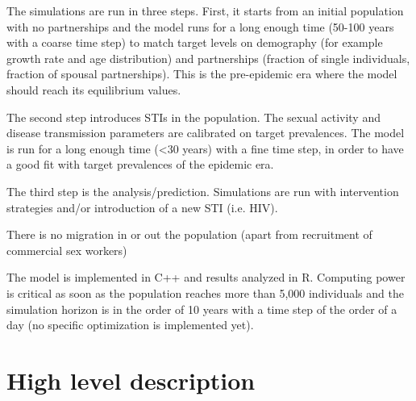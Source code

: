 \documentclass[11pt, onecolumn]{article}
\begin{document}
The simulations are run in three steps. First, it starts from an initial population with no partnerships and the model runs for a long enough time (50-100 years with a coarse time step) to match target levels on demography (for example growth rate and age distribution) and partnerships (fraction of single individuals, fraction of spousal partnerships). This is the pre-epidemic era where the model should reach its equilibrium values.

The second step introduces STIs in the population. The sexual activity and disease transmission parameters are calibrated on target prevalences. The model is run for a long enough time (<30 years) with a fine time step, in order to have a good fit with target prevalences of the epidemic era. 

The third step is the analysis/prediction. Simulations are run with intervention strategies and/or introduction of a new STI (i.e. HIV).

There is no migration in or out the population (apart from recruitment of commercial sex workers)

The model is implemented in C++ and results analyzed in R. Computing power is critical as soon as the population reaches more than 5,000 individuals and the simulation horizon is in the order of 10 years with a time step of the order of a day (no specific optimization is implemented yet).



\twocolumn

\section{High level description}
\end{document}
